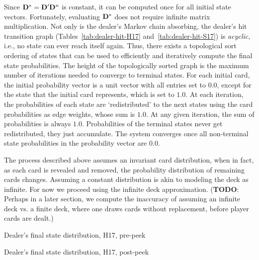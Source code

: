 
Since $\mathbf{D^*}=\mathbf{D^\prime}\mathbf{D}^n$ is constant, it can be computed once
for all initial state vectors.
Fortunately, evaluating $\mathbf{D^*}$ does not require infinite 
matrix multiplication.
Not only is the dealer's Markov chain absorbing, 
the dealer's hit transition graph
(Tables~\ref{tab:dealer-hit-H17} and~\ref{tab:dealer-hit-S17})
is \emph{acyclic}, i.e., no state can ever reach itself again.  
Thus, there exists a topological sort
ordering of states that can be used to efficiently and iteratively 
compute the final state probabilities.
The height of the topologically sorted graph is the maximum 
number of iterations needed to converge to terminal states.
For each initial card, the initial probability vector
is a unit vector with all entries set to $0.0$, except for the state
that the initial card represents, which is set to $1.0$.
At each iteration, the probabilities of each state are 
`redistributed' to the next states using the 
card probabilities as edge weights, whose sum is $1.0$.  
At any given iteration, the sum of probabilities is always $1.0$.
Probabilities of the terminal states never get redistributed, 
they just accumulate.  
The system converges once all non-terminal state probabilities 
in the probability vector are 0.0.

The process described above assumes an invariant
card distribution, when in fact, as each card is revealed and removed, 
the probability distribution of remaining cards changes.
Assuming a constant distribution is akin to modeling
the deck as infinite.
For now we proceed using the infinite deck approximation.  
(\textbf{TODO}: Perhaps in a later section, we compute the inaccuracy of
assuming an infinite deck vs. a finite deck, where one 
draws cards without replacement, before player cards are dealt.)


\begin{table}[ht!]
\caption{Dealer's final state distribution, H17, pre-peek}
\begin{center}

\end{center}
\label{tab:dealer-final-H17-pre-peek}
\end{table}

\begin{table}[ht!]
\caption{Dealer's final state distribution, H17, post-peek}
\begin{center}

\end{center}
\label{tab:dealer-final-H17-post-peek}
\end{table}

